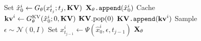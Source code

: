 \begin{figure}[t!]
\begin{minipage}[t]{0.48\textwidth}
\begin{algorithm}[H]
\begin{algorithmic}[1]
          \State Set $\hat{x}^i_{0} \gets G_\theta(x^i_{t_j}; t_j, \mathbf{KV})$
            \State $\mathbf{X}_{\theta}{\texttt{.append}}(\hat x^i_{0})$
            \State Cache $\mathbf{kv}^i \gets G_\theta^\text{KV}(\hat{x}^i_{0}; 0, \mathbf{KV})$
              \State $\mathbf{KV}.\mathrm{pop}(0)$ 
            \EndIf
            \State $\mathbf{KV}{\texttt{.append}}(\mathbf{kv}^i)$
          \Else
            \State Sample $\epsilon \sim \mathcal{N}(0, I)$
            \State Set $x^i_{t_{j-1}} \gets \Psi(\hat{x}^i_0, \epsilon, t_{j-1})$
          \EndIf
        \EndFor
      \EndFor
      \State \Return $\mathbf{X}_{\theta}$
    \end{algorithmic}
    \label{alg:inference}
  \end{algorithm}
\end{minipage}
\vspace{-1em}
\end{figure}